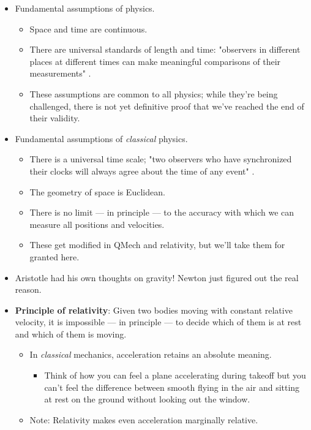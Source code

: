 \documentclass[../notes.tex]{subfiles}
\begin{document}
\begin{itemize}
    \item Fundamental assumptions of physics.
    \begin{itemize}
        \item Space and time are continuous.
        \item There are universal standards of length and time: "observers in different places at different times can make meaningful comparisons of their measurements" \parencite[2]{bib:KibbleBerkshire}.
        \item These assumptions are common to all physics; while they're being challenged, there is not yet definitive proof that we've reached the end of their validity.
    \end{itemize}
    \item Fundamental assumptions of \emph{classical} physics.
    \begin{itemize}
        \item There is a universal time scale; "two observers who have synchronized their clocks will always agree about the time of any event" \parencite[2]{bib:KibbleBerkshire}.
        \item The geometry of space is Euclidean.
        \item There is no limit --- in principle --- to the accuracy with which we can measure all positions and velocities.
        \item These get modified in QMech and relativity, but we'll take them for granted here.
    \end{itemize}
    \item Aristotle had his own thoughts on gravity! Newton just figured out the real reason.
    \item \textbf{Principle of relativity}: Given two bodies moving with constant relative velocity, it is impossible --- in principle --- to decide which of them is at rest and which of them is moving.
    \begin{itemize}
        \item In \emph{classical} mechanics, acceleration retains an absolute meaning.
        \begin{itemize}
            \item Think of how you can feel a plane accelerating during takeoff but you can't feel the difference between smooth flying in the air and sitting at rest on the ground without looking out the window.
        \end{itemize}
        \item Note: Relativity makes even acceleration marginally relative.

\end{itemize}
\end{itemize}
\end{document}
